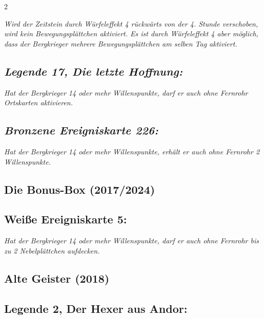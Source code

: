 \documentclass[10pt, a4paper, oneside]{book}
\newcommand{\fan}[1]{\textit{#1}}
\begin{document}
\begin{multicols*}{2}
\begin{bgcolor}
\fan{Wird der Zeitstein durch Würfeleffekt 4 rückwärts von der 4. Stunde verschoben, wird kein Bewegungsplättchen aktiviert. Es ist durch Würfeleffekt 4 aber möglich, dass der Bergkrieger mehrere Bewegungsplättchen am selben Tag aktiviert.}




\subsection{\fan{Legende 17, Die letzte Hoffnung:}}

\fan{Hat der Bergkrieger 14 oder mehr Willenspunkte, darf er auch ohne Fernrohr Ortskarten aktivieren.}


\subsection{\fan{Bronzene Ereigniskarte 226:}}

\fan{Hat der Bergkrieger 14 oder mehr Willenspunkte, erhält er auch ohne Fernrohr 2 Willenspunkte.}

\end{bgcolor}



\begin{bgcolor}[color-bb]

\section{Die Bonus-Box (2017/2024)}

\subsection{Weiße Ereigniskarte 5:}


\fan{Hat der Bergkrieger 14 oder mehr Willenspunkte, darf er auch ohne Fernrohr bis zu 2 Nebelplättchen aufdecken.}

\end{bgcolor}





\begin{bgcolor}[color-ag]
\section{Alte Geister (2018)}

\subsection{Legende 2, Der Hexer aus Andor:}


\end{bgcolor}
\end{multicols*}
\end{document}
